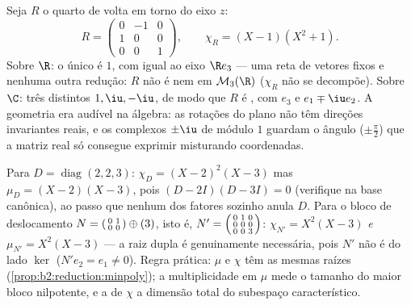 \begin{example}\label{ex:b2:reduction:rotation3d}
Seja $R$ o quarto de volta em torno do eixo $z$:
\[
R = \begin{pmatrix}
0 & -1 & 0\\
1 & 0 & 0\\
0 & 0 & 1
\end{pmatrix},
\qquad
\chi_R = (X - 1)(X^2 + 1).
\]
Sobre $\R$: o único  é $1$, com  igual ao eixo
$\R e_3$ --- uma reta de vetores fixos e nenhuma outra
redução: $R$ não é  nem  em
$\mathcal{M}_3(\R)$ ($\chi_R$ não se decompõe). Sobre $\C$: três
 distintos $1, \iu, -\iu$, de modo que $R$ é ,
com  $e_3$ e $e_1 \mp \iu e_2$. A geometria era
audível na álgebra: as rotações do plano não têm direções invariantes
reais, e os  complexos $\pm\iu$ de
módulo $1$ guardam o ângulo ($\pm\frac\pi2$) que a matriz real
só consegue exprimir misturando coordenadas.
\end{example}

\begin{example}\label{ex:b2:reduction:minvschar}
Para $D = \operatorname{diag}(2, 2, 3)$: $\chi_D = (X - 2)^2(X -
3)$ mas $\mu_D = (X - 2)(X - 3)$, pois $(D - 2I)(D - 3I) = 0$
(verifique na base canônica), ao passo que nenhum dos fatores sozinho anula
$D$. Para o bloco de deslocamento $N = \begin{psmallmatrix}0 & 1\\ 0 &
0\end{psmallmatrix} \oplus (3)$, isto é, $N' =
\begin{psmallmatrix}0 & 1 & 0\\ 0 & 0 & 0\\ 0 & 0 &
3\end{psmallmatrix}$: $\chi_{N'} = X^2(X - 3)$ \emph{e}
$\mu_{N'} = X^2(X - 3)$ --- a raiz dupla é genuinamente necessária,
pois $N'$ não é  do lado $\ker$ ($N'e_2 =
e_1 \neq 0$). Regra prática: $\mu$ e $\chi$ têm as mesmas raízes
(\cref{prop:b2:reduction:minpoly}); a multiplicidade em $\mu$
mede o tamanho do maior bloco nilpotente, e a de
$\chi$ a dimensão total do subespaço característico.
\end{example}

